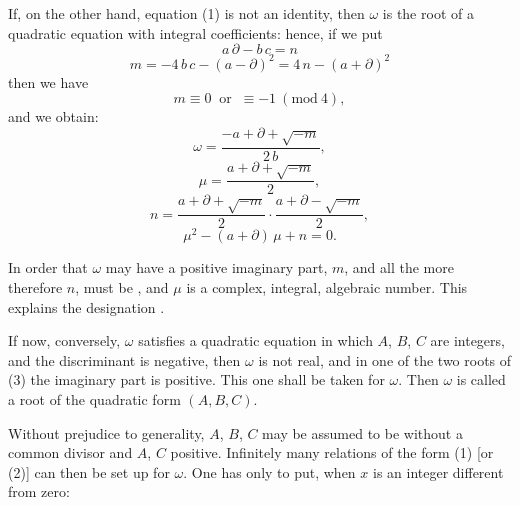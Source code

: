 If, on the other hand, equation (1) is not an identity, then $\omega$ is
the root of a quadratic equation with integral coefficients:
hence, if we put
\[
a\,\partial - b\,c = n
\]
\[
m = -4\,b\,c - (a-\partial)^2 = 4\,n - (a+\partial)^2
\]
then we have
\[
m \equiv 0 \ \text{ or } \ \equiv -1 \ (\mathrm{mod}\ 4),
\]
and we obtain:
\[
\omega = \frac{-a+\partial+\sqrt{-m}}{2\,b},
\]
\[
\mu = \frac{a+\partial+\sqrt{-m}}{2},
\]
\[
n = \frac{a+\partial+\sqrt{-m}}{2}\cdot\frac{a+\partial-\sqrt{-m}}{2}, %
\]
\[
\mu^2 - (a+\partial)\,\mu + n = 0.
\]

In order that $\omega$ may have a positive imaginary part, $m$, and all
the more therefore $n$, must be , and $\mu$ is a complex,
integral, algebraic number. This explains the designation
.

If now, conversely, $\omega$ satisfies a quadratic equation
in which $A$, $B$, $C$ are integers, and the discriminant
is negative, then $\omega$ is not real, and in one of the two roots
of (3) the imaginary part is positive. This one shall be taken for
$\omega$. Then $\omega$ is called a root of the quadratic form
$(A, B, C)$.

Without prejudice to generality, $A$, $B$, $C$ may be assumed to be
without a common divisor and $A$, $C$ positive. Infinitely many
relations of the form (1) [or (2)] can then be set up for $\omega$. One
has only to put, when $x$ is an integer different from zero:
